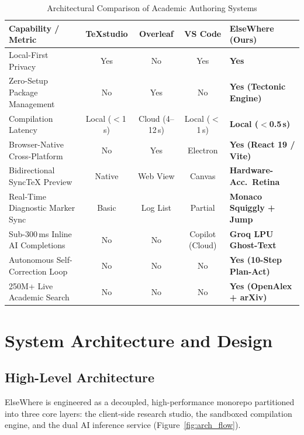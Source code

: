 \documentclass[12pt,a4paper]{article}
\begin{document}
\begin{table}[htbp]
\centering
\caption{Architectural Comparison of Academic Authoring Systems}
\label{tab:lit_comparison}
\footnotesize
\renewcommand{\arraystretch}{1.35}
\begin{tabularx}{\textwidth}{>{\raggedright\arraybackslash}p{3.7cm}CCCH}
\toprule
{}
\textbf{Capability / Metric} & \textbf{\TeX{}studio} & \textbf{Overleaf} & \textbf{VS Code} & \textbf{ElseWhere (Ours)} \\
\midrule
Local-First Privacy & Yes & No & Yes & \textbf{Yes} \\
Zero-Setup Package Management & No & Yes & No & \textbf{Yes (Tectonic Engine)} \\
Compilation Latency & Local ($<$1\,s) & Cloud (4--12\,s) & Local ($<$1\,s) & \textbf{Local ($<$0.5\,s)} \\
Browser-Native Cross-Platform & No & Yes & Electron & \textbf{Yes (React 19 / Vite)} \\
Bidirectional Sync\TeX{} Preview & Native & Web View & Canvas & \textbf{Hardware-Acc.\ Retina} \\
Real-Time Diagnostic Marker Sync & Basic & Log List & Partial & \textbf{Monaco Squiggly + Jump} \\
Sub-300\,ms Inline AI Completions & No & No & Copilot (Cloud) & \textbf{Groq LPU Ghost-Text} \\
Autonomous Self-Correction Loop & No & No & No & \textbf{Yes (10-Step Plan-Act)} \\
250M+ Live Academic Search & No & No & No & \textbf{Yes (OpenAlex + arXiv)} \\
\bottomrule
\end{tabularx}
\end{table}

\clearpage
\section{System Architecture and Design}\label{sec:arch}

\subsection{High-Level Architecture}
ElseWhere is engineered as a decoupled, high-performance monorepo partitioned into three core layers: the client-side research studio, the sandboxed compilation engine, and the dual AI inference service (Figure~\ref{fig:arch_flow}).
\end{document}
